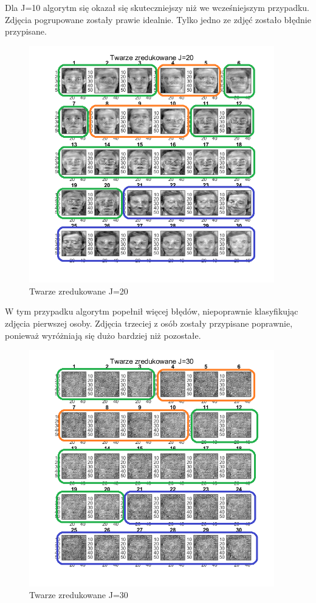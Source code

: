 \documentclass[11pt, a4paper]{article}
\newcommand{\fbi}{\leavevmode{\parindent=1em\indent}}
\begin{document}
\fbi
Dla J=10 algorytm się okazał się skuteczniejszy niż we wcześniejszym przypadku. Zdjęcia pogrupowane zostały prawie idealnie. Tylko jedno ze zdjęć zostało błędnie przypisane.


\begin{figure}[H]
	\centering
	\includegraphics[width=0.95\textwidth]{./assets/ilustracja_zad2_redukcja_j20.png}
	\caption{Twarze zredukowane J=20}
	\label{fig:ilustracja_zad2_redukcja_j20}
\end{figure}

\fbi
W tym przypadku algorytm popełnił więcej błędów, niepoprawnie klasyfikując zdjęcia pierwszej osoby. Zdjęcia trzeciej z osób zostały przypisane poprawnie, ponieważ wyróżniają się dużo bardziej niż pozostałe.


\begin{figure}[H]
	\centering
	\includegraphics[width=0.95\textwidth]{./assets/ilustracja_zad2_redukcja_j30.png}
	\caption{Twarze zredukowane J=30}
	\label{fig:ilustracja_zad2_redukcja_j30}
\end{figure}
\end{document}
